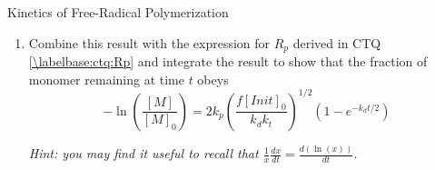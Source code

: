 \begin{activity}{Kinetics of Free-Radical Polymerization}
\begin{exercises}
\begin{enumerate}
				\begin{solution}{}
					Referencing the table in Model \ref{\labelbase:mdl:kineticeqns}, we can write
					\begin{equation*}
						-\frac{d[\text{Init}]}{dt} = k_d[\text{Init}]
					\end{equation*}
					Rearranging and integrating, we find
					\begin{align*}
						\frac{1}{[\text{Init}]}\frac{d[\text{Init}]}{dt} &= -k_d\\
							\frac{d(\ln [\text{Init}])}{dt} &= -k_d\\
							\ln[\text{Init}] &= \int -k_d \, dt + C\\
							\ln[\text{Init}] &= -k_d t + C\\
							[\text{Init}] &= e^{-k_d t + C}\\
								&= A e^{-k_d t}
					\end{align*}
					Since we are told that the initial initiator concentration is $[\text{Init}]_0$, we can solve for the integration constant $A$ using
					\begin{align*}
						[\text{Init}]_0 &= A e^{-k_d \cdot 0}\\
						[\text{Init}]_0 &= A
					\end{align*}
					Thus, 
					\begin{equation*}
						[\text{Init}] = [\text{Init}]_0 e^{-k_d t}
					\end{equation*}
				\end{solution}
			
			\item \label{\labelbase:exc:integratedrate} Combine this result with the expression for $R_p$ derived in CTQ \ref{\labelbase:ctq:Rp} and integrate the result to show that the fraction of monomer remaining at time $t$ obeys
				\begin{equation*}
					-\ln\left(\frac{[M]}{[M]_0}\right) = 2k_p\left(\frac{f[Init]_0}{k_d k_t}\right)^{1/2}\left(1-e^{-k_d t/2}\right)
				\end{equation*}
				
				\emph{Hint: you may find it useful to recall that $\frac{1}{x}\frac{dx}{dt} = \frac{d(\ln(x))}{dt}$.}
			

\end{enumerate}
\end{exercises}
\end{activity}
